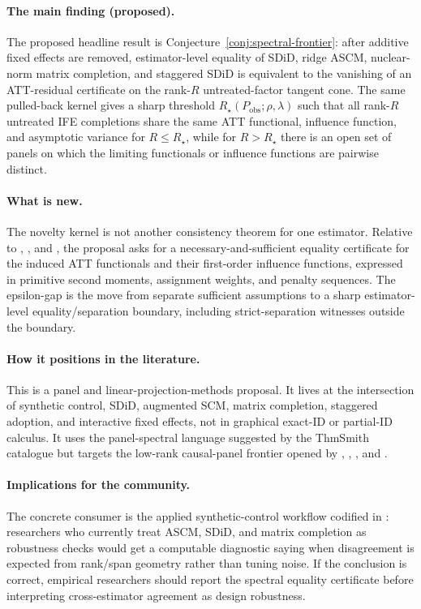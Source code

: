 \documentclass[11pt]{article}
\theoremstyle{definition}
\theoremstyle{plain}
\theoremstyle{remark}
\begin{document}
\paragraph{The main finding (proposed).}
The proposed headline result is Conjecture~\ref{conj:spectral-frontier}: after additive fixed effects are removed, estimator-level equality of SDiD, ridge ASCM, nuclear-norm matrix completion, and staggered SDiD is equivalent to the vanishing of an ATT-residual certificate on the rank-\(R\) untreated-factor tangent cone.  The same pulled-back kernel gives a sharp threshold \(R_\star(P_{\mathrm{obs}};\rho,\lambda)\) such that all rank-\(R\) untreated IFE completions share the same ATT functional, influence function, and asymptotic variance for \(R\le R_\star\), while for \(R>R_\star\) there is an open set of panels on which the limiting functionals or influence functions are pairwise distinct.

\paragraph{What is new.}
The novelty kernel is not another consistency theorem for one estimator.  Relative to \citet{ArkhangelskyAtheyHirshbergImbensWager2021}, \citet{AtheyBayatiDoudchenkoImbensKhosravi2021}, and \citet{BenMichaelFellerRothstein2021}, the proposal asks for a necessary-and-sufficient equality certificate for the induced ATT functionals and their first-order influence functions, expressed in primitive second moments, assignment weights, and penalty sequences.  The epsilon-gap is the move from separate sufficient assumptions to a sharp estimator-level equality/separation boundary, including strict-separation witnesses outside the boundary.

\paragraph{How it positions in the literature.}
This is a panel and linear-projection-methods proposal.  It lives at the intersection of synthetic control, SDiD, augmented SCM, matrix completion, staggered adoption, and interactive fixed effects, not in graphical exact-ID or partial-ID calculus.  It uses the panel-spectral language suggested by the ThmSmith catalogue but targets the low-rank causal-panel frontier opened by \citet{Xu2017}, \citet{AtheyBayatiDoudchenkoImbensKhosravi2021}, \citet{ArkhangelskyAtheyHirshbergImbensWager2021}, and \citet{ArkhangelskyImbensLeiLuo2024}.

\paragraph{Implications for the community.}
The concrete consumer is the applied synthetic-control workflow codified in \citet{Abadie2021}: researchers who currently treat ASCM, SDiD, and matrix completion as robustness checks would get a computable diagnostic saying when disagreement is expected from rank/span geometry rather than tuning noise.  If the conclusion is correct, empirical researchers should report the spectral equality certificate before interpreting cross-estimator agreement as design robustness.
\end{document}
